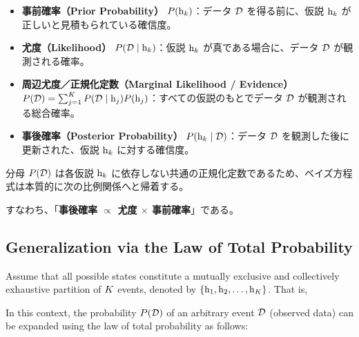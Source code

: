     \begin{itemize}
        \item \textbf{事前確率（Prior Probability）} $P( \mathrm{h}_{k} )$：データ $\mathcal{D}$ を得る前に、仮説 $\mathrm{h}_{k}$ が正しいと見積もられている確信度。
        \item \textbf{尤度（Likelihood）} $P( \mathcal{D} \mid \mathrm{h}_{k} )$：仮説 $\mathrm{h}_{k}$ が真である場合に、データ $\mathcal{D}$ が観測される確率。
        \item \textbf{周辺尤度／正規化定数（Marginal Likelihood / Evidence）} $P( \mathcal{D} ) = \sum_{j=1}^{K} P( \mathcal{D} \mid \mathrm{h}_{j} ) P( \mathrm{h}_{j} )$：すべての仮説のもとでデータ $\mathcal{D}$ が観測される総合確率。
        \item \textbf{事後確率（Posterior Probability）} $P( \mathrm{h}_{k} \mid \mathcal{D} )$：データ $\mathcal{D}$ を観測した後に更新された、仮説 $\mathrm{h}_{k}$ に対する確信度。
    \end{itemize}

    分母 $P( \mathcal{D} )$ は各仮説 $\mathrm{h}_{k}$ に依存しない共通の正規化定数であるため、ベイズ方程式は本質的に次の比例関係へと帰着する。

    

    すなわち、「\textbf{事後確率 $\propto$ 尤度 $\times$ 事前確率}」である。

\else
    \subsection{Generalization via the Law of Total Probability}
    Assume that all possible states constitute a mutually exclusive and collectively exhaustive partition of $K$ events, denoted by $\{\mathrm{h}_1, \mathrm{h}_2, \dots, \mathrm{h}_{K}\}$.
    That is,

    

    In this context, the probability $P( \mathcal{D} )$ of an arbitrary event $\mathcal{D}$ (observed data) can be expanded using the law of total probability as follows:

    

